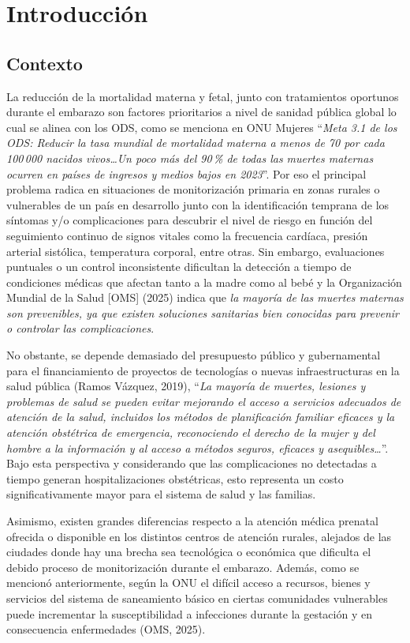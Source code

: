\section{Introducción}
\subsection{Contexto}

La reducción de la mortalidad materna y fetal, junto con tratamientos oportunos
durante el embarazo son factores prioritarios a nivel de sanidad pública global
lo cual se alinea con los ODS, como se menciona en ONU Mujeres ``\emph{Meta 3.1
de los ODS: Reducir la tasa mundial de mortalidad materna a menos de 70 por cada
100\,000 nacidos vivos\ldots Un poco más del 90\,\% de todas las muertes maternas
ocurren en países de ingresos y medios bajos en 2023}''. Por eso el principal
problema radica en situaciones de monitorización primaria en zonas rurales o
vulnerables de un país en desarrollo junto con la identificación temprana de los
síntomas y/o complicaciones para descubrir el nivel de riesgo en función del
seguimiento continuo de signos vitales como la frecuencia cardíaca, presión
arterial sistólica, temperatura corporal, entre otras. Sin embargo, evaluaciones
puntuales o un control inconsistente dificultan la detección a tiempo de
condiciones médicas que afectan tanto a la madre como al bebé y la Organización
Mundial de la Salud [OMS] (2025) indica que \emph{la mayoría de las muertes
maternas son prevenibles, ya que existen soluciones sanitarias bien conocidas
para prevenir o controlar las complicaciones}.

No obstante, se depende demasiado del presupuesto público y gubernamental para el
financiamiento de proyectos de tecnologías o nuevas infraestructuras en la salud
pública (Ramos Vázquez, 2019), ``\emph{La mayoría de muertes, lesiones y
problemas de salud se pueden evitar mejorando el acceso a servicios adecuados de
atención de la salud, incluidos los métodos de planificación familiar eficaces y
la atención obstétrica de emergencia, reconociendo el derecho de la mujer y del
hombre a la información y al acceso a métodos seguros, eficaces y
asequibles\ldots}''. Bajo esta perspectiva y considerando que las complicaciones
no detectadas a tiempo generan hospitalizaciones obstétricas, esto representa un
costo significativamente mayor para el sistema de salud y las familias.

Asimismo, existen grandes diferencias respecto a la atención médica prenatal
ofrecida o disponible en los distintos centros de atención rurales, alejados de
las ciudades donde hay una brecha sea tecnológica o económica que dificulta el
debido proceso de monitorización durante el embarazo. Además, como se mencionó
anteriormente, según la ONU el difícil acceso a recursos, bienes y servicios del
sistema de saneamiento básico en ciertas comunidades vulnerables puede
incrementar la susceptibilidad a infecciones durante la gestación y en
consecuencia enfermedades (OMS, 2025).

